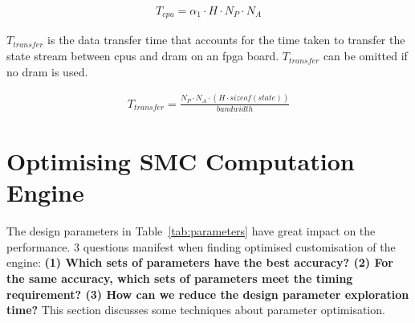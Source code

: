 \begin{equation}
\begin{aligned}
T_{cpu} = \alpha_1 \cdot H \cdot N_P \cdot N_A
\end{aligned}
\end{equation}

$T_{transfer}$ is the data transfer time that accounts for the time taken to transfer the state stream between \glspl{cpu} and \gls{dram} on an \gls{fpga} board.
$T_{transfer}$ can be omitted if no \gls{dram} is used.

\begin{equation}
\begin{aligned}
T_{transfer} = \frac{N_P \cdot N_A \cdot \left ( H \cdot sizeof(state)\right)}{bandwidth}
\end{aligned}
\end{equation}




\section{Optimising SMC Computation Engine}
\label{sec:flow_optimisation}

The design parameters in Table~\ref{tab:parameters} have great impact on the performance.
3 questions manifest when finding optimised customisation of the engine:
\textbf{(1) Which sets of parameters have the best accuracy?
(2) For the same accuracy, which sets of parameters meet the timing requirement?
(3) How can we reduce the design parameter exploration time?}
This section discusses some techniques about parameter optimisation.

